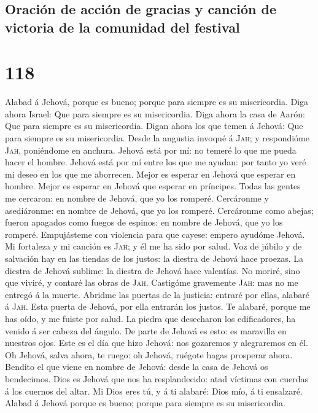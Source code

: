 \hypertarget{oraciuxf3n-de-acciuxf3n-de-gracias-y-canciuxf3n-de-victoria-de-la-comunidad-del-festival}{%
\subsection{Oración de acción de gracias y canción de victoria de la
comunidad del
festival}\label{oraciuxf3n-de-acciuxf3n-de-gracias-y-canciuxf3n-de-victoria-de-la-comunidad-del-festival}}

\hypertarget{section-117}{%
\section{118}\label{section-117}}

 Alabad á Jehová, porque es bueno; porque para siempre es
su misericordia.  Diga ahora Israel: Que para siempre es
su misericordia.  Diga ahora la casa de Aarón: Que para
siempre es su misericordia.  Digan ahora los que temen á
Jehová: Que para siempre es su misericordia.  Desde la
angustia invoqué á \textsc{Jah}; y respondióme \textsc{Jah}, poniéndome
en anchura.  Jehová está por mí: no temeré lo que me pueda
hacer el hombre.  Jehová está por mí entre los que me
ayudan: por tanto yo veré mi deseo en los que me aborrecen.
 Mejor es esperar en Jehová que esperar en hombre.
 Mejor es esperar en Jehová que esperar en príncipes.
 Todas las gentes me cercaron: en nombre de Jehová, que
yo los romperé.  Cercáronme y asediáronme: en nombre de
Jehová, que yo los romperé.  Cercáronme como abejas;
fueron apagados como fuegos de espinos: en nombre de Jehová, que yo los
romperé.  Empujásteme con violencia para que cayese:
empero ayudóme Jehová.  Mi fortaleza y mi canción es
\textsc{Jah}; y él me ha sido por salud.  Voz de júbilo y
de salvación hay en las tiendas de los justos: la diestra de Jehová hace
proezas.  La diestra de Jehová sublime: la diestra de
Jehová hace valentías.  No moriré, sino que viviré, y
contaré las obras de \textsc{Jah}.  Castigóme gravemente
\textsc{Jah}: mas no me entregó á la muerte.  Abridme las
puertas de la justicia: entraré por ellas, alabaré á \textsc{Jah}.
 Esta puerta de Jehová, por ella entrarán los justos.
 Te alabaré, porque me has oído, y me fuiste por salud.
 La piedra que desecharon los edificadores, ha venido á
ser cabeza del ángulo.  De parte de Jehová es esto: es
maravilla en nuestros ojos.  Este es el día que hizo
Jehová: nos gozaremos y alegraremos en él.  Oh Jehová,
salva ahora, te ruego: oh Jehová, ruégote hagas prosperar ahora.
 Bendito el que viene en nombre de Jehová: desde la casa
de Jehová os bendecimos.  Dios es Jehová que nos ha
resplandecido: atad víctimas con cuerdas á los cuernos del altar.
 Mi Dios eres tú, y á ti alabaré: Dios mío, á ti
ensalzaré.  Alabad á Jehová porque es bueno; porque para
siempre es su misericordia.

